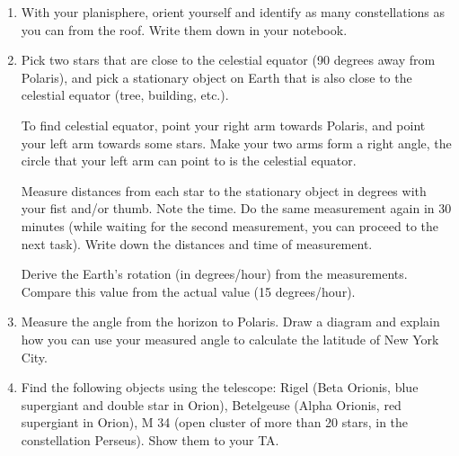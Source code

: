 \documentclass[10pt]{article}%
\begin{document}
\begin{enumerate}
\item With your planisphere, orient yourself and identify as many constellations as you can from the roof. Write them down in your notebook.

\item Pick two stars that are close to the celestial equator (90 degrees away from Polaris), and pick a stationary object on Earth that is also close to the celestial equator (tree, building, etc.). 

To find celestial equator, point your right arm towards Polaris, and point your left arm towards some stars. Make your two arms form a right angle, the circle that your left arm can point to is the celestial equator.

Measure distances from each star to the stationary object in degrees with your fist and/or thumb. Note the time. Do the same measurement again in 30 minutes (while waiting for the second measurement, you can proceed to the next task). Write down the distances and time of measurement.

Derive the Earth's rotation (in degrees/hour) from the measurements. Compare this value from the actual value (15 degrees/hour). %

\item Measure the angle from the horizon to Polaris. Draw a diagram and explain how you can use your measured angle to calculate the latitude of New York City.

\item Find the following objects using the telescope: Rigel (Beta Orionis, blue supergiant and double star in Orion), Betelgeuse (Alpha Orionis, red supergiant in Orion), M 34 (open cluster of more than 20 stars, in the constellation Perseus). Show them to your TA.




\end{enumerate}
\end{document}
